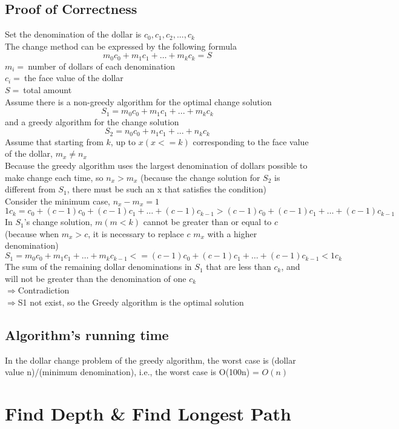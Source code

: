 \documentclass{article}
\begin{document}
\subsection{Proof of Correctness}
Set the denomination of the dollar is $c_0, c_1, c_2, ... , c_k$\\
The change method can be expressed by the following formula
$$
m_0c_0 + m_1c_1 + … + m_kc_k = S
$$
$m_i =\ $number of dollars of each denomination\\
$c_i =\ $the face value of the dollar\\
$S =\ $total amount\\
Assume there is a non-greedy algorithm for the optimal change solution 
$$S_1 = m_0c_0 + m_1c_1 + ... + m_kc_k$$ 
and a greedy algorithm for the change solution 
$$S_2 = n_0c_0 + n_1c_1 + ... + n_kc_k$$
Assume that starting from $k$, up to $x(x <= k)$ corresponding to the face value of the dollar, $m_x \neq n_x$\\
Because the greedy algorithm uses the largest denomination of dollars possible to make change each time, so $n_x > m_x$ (because the change solution for $S_2$ is different from $S_1$, there must be such an x that satisfies the condition)\\
Consider the minimum case, $n_x - m_x = 1$
$$
1c_k = c_0 + (c-1)c_0 + (c-1)c_1 + … + (c-1)c_{k-1} > (c-1)c_0 + (c-1)c_1 + … + (c-1)c_{k-1}
$$
In $S_1$'s change solution, $m(m < k)$ cannot be greater than or equal to $c$ (because when $m_x > c$, it is necessary to replace $c$ $m_x$ with a higher denomination)
$$
S_1 = m_0c_0 + m_1c_1 + … + m_kc_{k-1} <= (c-1)c_0 + (c-1)c_1 + … + (c-1)c_{k-1} < 1c_k
$$
The sum of the remaining dollar denominations in $S_1$ that are less than $c_k$, and will not be greater than the denomination of one $c_k$\\
$\Rightarrow$Contradiction\\
$\Rightarrow$S1 not exist, so the Greedy algorithm is the optimal solution

\subsection{Algorithm's running time}
In the dollar change problem of the greedy algorithm, the worst case is (dollar value n)/(minimum denomination), i.e., the worst case is O(100n) = $O(n)$
\clearpage

\section{Find Depth & Find Longest Path}
\end{document}
